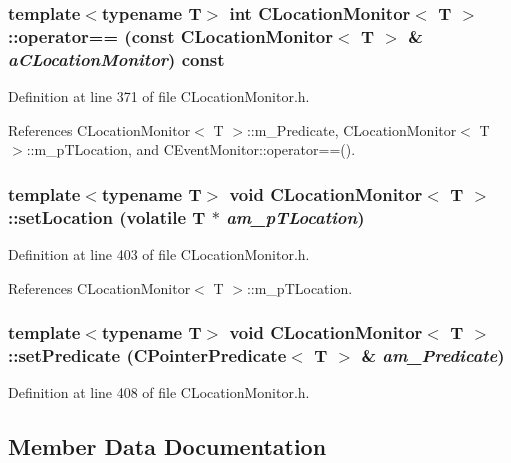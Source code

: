 \subsubsection{\setlength{\rightskip}{0pt plus 5cm}template$<$typename T$>$ int CLocation\-Monitor$<$ T $>$::operator== (const CLocation\-Monitor$<$ T $>$ \& {\em a\-CLocation\-Monitor}) const\hspace{0.3cm}{\tt  [inline]}}\label{classCLocationMonitor_a4}




Definition at line 371 of file CLocation\-Monitor.h.

References CLocation\-Monitor$<$ T $>$::m\_\-Predicate, CLocation\-Monitor$<$ T $>$::m\_\-p\-TLocation, and CEvent\-Monitor::operator==().
\subsubsection{\setlength{\rightskip}{0pt plus 5cm}template$<$typename T$>$ void CLocation\-Monitor$<$ T $>$::set\-Location (volatile T $\ast$ {\em am\_\-p\-TLocation})\hspace{0.3cm}{\tt  [inline, protected]}}\label{classCLocationMonitor_b0}




Definition at line 403 of file CLocation\-Monitor.h.

References CLocation\-Monitor$<$ T $>$::m\_\-p\-TLocation.
\subsubsection{\setlength{\rightskip}{0pt plus 5cm}template$<$typename T$>$ void CLocation\-Monitor$<$ T $>$::set\-Predicate ({\bf CPointer\-Predicate}$<$ T $>$ \& {\em am\_\-Predicate})\hspace{0.3cm}{\tt  [inline, protected]}}\label{classCLocationMonitor_b1}




Definition at line 408 of file CLocation\-Monitor.h.

\subsection{Member Data Documentation}
